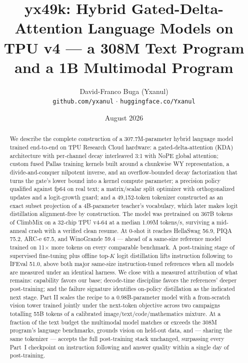\documentclass[10pt]{article}
\title{\textbf{yx49k: Hybrid Gated-Delta-Attention Language Models on
TPU v4 --- a 308M Text Program and a 1B Multimodal Program}}
\author{David-Franco Buga (Yxanul)\\
\small\texttt{github.com/yxanul} $\cdot$ \texttt{huggingface.co/Yxanul}}
\date{August 2026}
\begin{document}
\maketitle

\begin{abstract}
We describe the complete construction of a 307.7M-parameter hybrid
language model trained end-to-end on TPU Research Cloud hardware: a
gated-delta-attention (KDA) architecture with per-channel decay
interleaved 3:1 with NoPE global attention; custom fused Pallas training
kernels built around a chunkwise WY representation, a divide-and-conquer
nilpotent inverse, and an overflow-bounded decay factorization that turns
the gate's lower bound into a kernel compute parameter; a
precision policy qualified against fp64 on real text; a matrix/scalar
split optimizer with orthogonalized updates and a logit-growth guard; and
a 49{,}152-token tokenizer constructed as an exact subset projection of a
4B-parameter teacher's vocabulary, which later makes logit distillation
alignment-free by construction. The model was pretrained on 367B tokens
of ClimbMix on a 32-chip TPU v4-64 at a median 1.09M tokens/s, surviving
a mid-anneal crash with a verified clean resume. At 0-shot it reaches
HellaSwag 56.9, PIQA 75.2, ARC-e 67.5, and WinoGrande 59.4 --- ahead of a
same-size reference model trained on 11$\times$ more tokens on every
comparable benchmark. A post-training stage of supervised fine-tuning
plus offline top-$K$ logit distillation lifts instruction following to
IFEval 51.0, above both major same-size instruction-tuned references when
all models are measured under an identical harness. We close with a
measured attribution of what remains: capability favors our base;
decode-time discipline favors the references' deeper post-training; and
the failure signature identifies on-policy distillation as the indicated
next stage.
Part II scales the recipe to a 0.98B-parameter model with a
from-scratch vision tower trained jointly under the next-token
objective across two campaigns totalling 55B tokens of a calibrated
image/text/code/mathematics mixture. At a fraction of the text budget
the multimodal model matches or exceeds the 308M program's language
benchmarks, grounds vision on held-out data, and --- sharing the same
tokenizer --- accepts the full post-training stack unchanged,
surpassing every Part~I checkpoint on instruction following and answer
quality within a single day of post-training.
\end{abstract}

\tableofcontents
\end{document}
